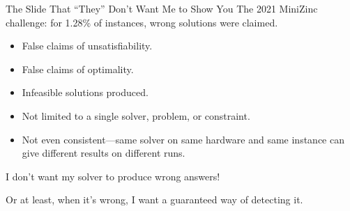 \documentclass{beamer}
\begin{document}
\begin{frame}{The Slide That ``They'' Don't Want Me to Show You}
    The 2021 MiniZinc challenge: for 1.28\% of instances, wrong solutions were claimed.
    \\
    \begin{itemize}
        \item False claims of unsatisfiability.
        \item False claims of optimality.
        \item Infeasible solutions produced.
        \item Not limited to a single solver, problem, or constraint.
        \item Not even consistent---same solver on same hardware and same instance can give
            different results on different runs.
    \end{itemize}
    \bigskip
    I don't want my solver to produce wrong answers!

    \bigskip\pause

    Or at least, when it's wrong, I want a guaranteed way of detecting it.
\end{frame}
\end{document}
